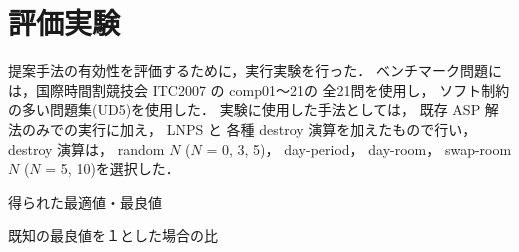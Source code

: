 \section{評価実験}
提案手法の有効性を評価するために，実行実験を行った．
ベンチマーク問題には，国際時間割競技会 ITC2007 の comp01〜21の
全21問を使用し，
ソフト制約の多い問題集(UD5)を使用した．
実験に使用した手法としては，
既存 ASP 解法のみでの実行に加え，
LNPS と 各種 destroy 演算を加えたもので行い，
destroy 演算は，
random $N$ ($N$ = 0, 3, 5)，
day-period，
day-room，
swap-room $N$ ($N$ = 5, 10)を選択した．


\begin{table*}[tbp]
  \label{table:bench:result1}
  \begin{center}
  \caption{得られた最適値・最良値}
\begin{tableA}
    
  \end{tableA}
  \end{center}
\end{table*}

\begin{table*}[tbp]
  \label{table:bench:result2}
  \centering
   \caption{既知の最良値を１とした場合の比}
  \begin{tableA}
    
  \end{tableA}
\end{table*}